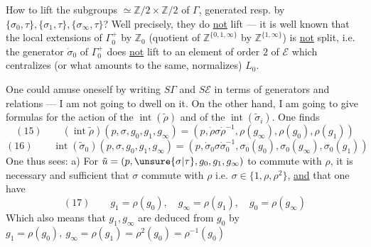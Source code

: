 How to lift the  subgroups $\simeq\mathbb Z/2\times\mathbb Z/2$ of $\Gamma$, generated resp. by $\{\sigma_0,\tau\},\{\sigma_1,\tau\},\{\sigma_\infty,\tau\}$? Well precisely, they do \uline{not} lift --- it is well known that the local extensions of $\Gamma_0^+$  by $\mathbb Z_0$ (quotient of $\mathbb Z^{\{0,1,\infty\}}$ by $\mathbb Z^{\{1,\infty\}}$) is \uline{not} split, i.e. the generator $\dot\sigma_0$ of $\Gamma_0^+$ does \uline{not} lift to an element of order $2$ of $\mathcal E$ which centralizes (or what amounts to the same, normalizes) $L_0$.

One could amuse oneself by writing $S\Gamma$ and $S\mathcal E$ in terms of generators and relations --- I am not going to dwell on it. On the other hand, I am going to give formulas for the action of the $\operatorname{int}(\tilde\rho)$ and of the $\operatorname{int}(\tilde\sigma_i)$. One finds
\[
(15)\qquad(\operatorname{int}\tilde\rho)(p,\sigma,g_0,g_1,g_\infty)=(p,\dot\rho\sigma\dot\rho^{-1},\rho(g_\infty),\rho(g_0),\rho(g_1))
\]
\[
(16)\qquad\operatorname{int}(\tilde\sigma_0)(p,\sigma,g_0,g_1,g_\infty)=(p,\dot\sigma_0\sigma\dot\sigma_0^{-1},\sigma_0(g_0),\sigma_0(g_\infty),\sigma_0(g_1))
\]
One thus sees: a) For $\tilde u=(p,\unsure{\sigma|\tau},g_0,g_1,g_\infty)$ to commute with $\rho$, it is necessary and sufficient that  $\sigma$ commute with $\rho$ i.e. $\sigma\in\{1,\rho,\rho^2\}$, \uline{and} that one have
\[
(17)\qquad g_1=\rho(g_0),\quad g_\infty=\rho(g_1),\quad g_0=\rho(g_\infty)
\]
Which also means that $g_1,g_\infty$ are deduced from $g_0$ by $g_1=\rho(g_0),\ g_\infty=\rho(g_1)=\rho^2(g_0)=\rho^{-1}(g_0)$
